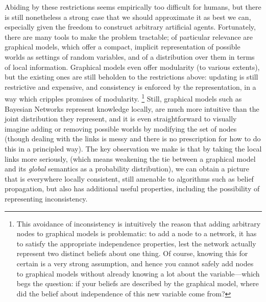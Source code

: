 \documentclass{article}
\newcommand\changed[1]{{\color{note-fg} #1}}
\begin{document}
	
	Abiding by these restrictions seems empirically too difficult for humans, \changed{but there is still nonetheless a strong case that we should} approximate it as best we can, especially given the freedom to construct arbitrary artificial agents. 
	Fortunately, there are many tools to make the problem tractable; of particular relevance are graphical models, which offer a compact, implicit representation of possible worlds as settings of random variables, and of a distribution over them in terms of local information. Graphical models even offer modularity (to various extents), but the existing ones are still beholden to the restrictions above: updating is still restrictive and expensive, and consistency is enforced by the representation, in a way which cripples promises of modularity.%
		\footnote{This avoidance of inconsistency is \changed{intuitively} the reason that adding arbitrary nodes to graphical models is problematic: to add a node to a network, it has to satisfy the appropriate independence properties, lest the network actually represent two distinct beliefs about one thing. Of course, knowing this for certain is a very strong assumption, and hence you cannot safely add nodes to graphical models without already knowing a lot about the variable---which begs the question: if your \changed{beliefs are described by the graphical model}, where did the belief about independence of this new variable come from?}
	Still, graphical models such as Bayesian Networks represent knowledge locally, are much more intuitive than the joint distribution they represent, and it is even straightforward to visually imagine adding or removing possible worlds by modifying the set of nodes (though dealing with the links is messy and there is no prescription for how to do this in a principled way). The key observation we make is that by taking the local links more seriously, (which means weakening the tie between a graphical model and its \emph{global} semantics as a probability distribution), we can obtain a picture that is everywhere locally consistent, still amenable to algorithms such as belief propagation, but also has additional useful properties, including the possibility of representing inconsistency.
	
\end{document}
